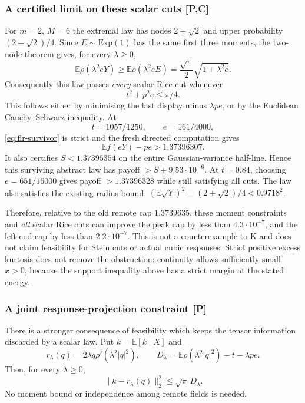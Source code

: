 \subsubsection{A certified limit on these scalar cuts [P,C]}
For $m=2$, $M=6$ the extremal law has nodes $2\pm\sqrt2$ and
upper probability $(2-\sqrt2)/4$. Since $E\sim\mathrm{Exp}(1)$
has the same first three moments, the two-node theorem gives, for
every $\lambda\ge0$,
\[
 \mathbb E\rho(\lambda^2eY)\ge
 \mathbb E\rho(\lambda^2eE)
 =\frac{\sqrt\pi}{2}\sqrt{1+\lambda^2e}.
\]
Consequently this law passes \emph{every} scalar Rice cut whenever
\begin{equation}\label{eq:flr-survivor}
 t^2+p^2e\le\pi/4.
\end{equation}
This follows either by minimising the last display minus $\lambda pe$,
or by the Euclidean Cauchy--Schwarz inequality. At
\[
 t=1057/1250,\qquad e=161/4000,
\]
\eqref{eq:flr-survivor} is strict and the fresh directed computation gives
\[
 \mathbb E f(eY)-pe>1.37396307.
\]
It also certifies $S<1.37395354$ on the entire Gaussian-variance
half-line. Hence this surviving abstract law has payoff
$>S+9.53\cdot10^{-6}$. At $t=0.84$, choosing $e=651/16000$
gives payoff $>1.37396328$ while still satisfying all cuts.
The law also satisfies the existing radius bound:
$(\mathbb E\sqrt Y)^2=(2+\sqrt2)/4<0.9718^2$.

Therefore, relative to the old remote cap $1.3739635$, these moment
constraints and \emph{all} scalar Rice cuts can improve the peak cap
by less than $4.3\cdot10^{-7}$, and the left-end cap by less than
$2.2\cdot10^{-7}$. This is not a counterexample to K and does not
claim feasibility for Stein cuts or actual cubic responses. Strict
positive excess kurtosis does not remove the obstruction: continuity
allows sufficiently small $x>0$, because the support inequality above
has a strict margin at the stated energy.

\subsubsection{A joint response-projection constraint [P]}
There is a stronger consequence of feasibility which keeps the tensor
information discarded by a scalar law. Put $\bar k=\mathbb E[k\mid X]$
and
\[
 r_\lambda(q)=2\lambda q\rho'(\lambda^2|q|^2),\qquad
 D_\lambda=\mathbb E\rho(\lambda^2|q|^2)-t-\lambda pe.
\]
Then, for every $\lambda\ge0$,
\begin{equation}\label{eq:flr-response-stability}
 \boxed{\quad
 \|\bar k-r_\lambda(q)\|_2^2\le\sqrt\pi\,D_\lambda.
 \quad}
\end{equation}
No moment bound or independence among remote fields is needed.

